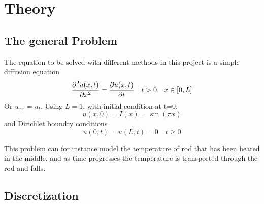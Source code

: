 \section{Theory}
\label{sec:theory}

\subsection{The general Problem}
The equation to be solved with different methods in this project is a simple diffusion equation
\begin{equation}
\pdv[2]{u(x,t)}{x} = \pdv{u(x,t)}{t} \quad t>0 \quad x\in [0,L]
    \label{eq:diffusionEQ}
\end{equation}
Or $u_{xx} = u_t$. Using $L=1$, with initial condition at t=0:
\begin{equation}
    u(x,0) = I(x) = \sin(\pi x)
    \label{eq:initialCondition}
\end{equation}
and Dirichlet boundry conditions
\begin{equation*}
    u(0,t) = u(L,t) = 0 \quad t \geq 0
\end{equation*}

This problem can for instance model the temperature of rod that has been heated in the middle,
and as time progresses the temperature is transported through the rod and falls.

\subsection{Discretization}

